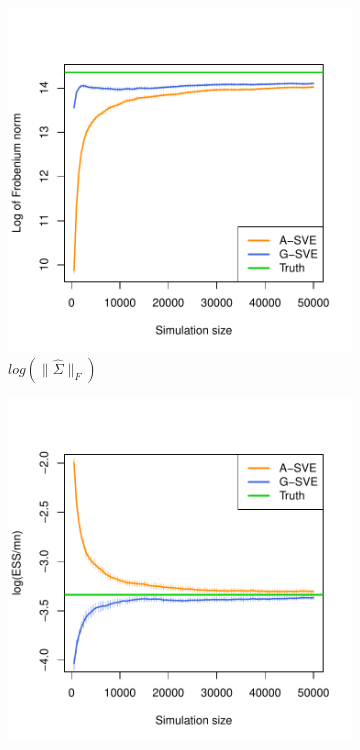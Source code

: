 \documentclass[11pt]{article}
\theoremstyle{remark}
\begin{document}
\begin{figure}[h]
    \centering
    \begin{subfigure}{0.4\textwidth}
      \centering
      \includegraphics[width = \textwidth]{plots/var-frob.pdf}
      \caption{$log(\|\hat{\Sigma}\|_F)$}
      \label{subfig:var-frob}
    \end{subfigure}
    \begin{subfigure}{0.4\textwidth}
      \centering
      \includegraphics[width = \textwidth]{plots/var-ess.pdf}

\end{subfigure}
\end{figure}
\end{document}
